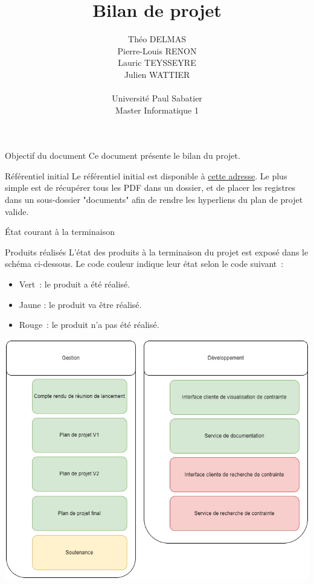 \documentclass[]{article}
\title{Bilan de projet}
\author{
    Théo DELMAS\\
    Pierre-Louis RENON\\
    Lauric TEYSSEYRE\\
    Julien WATTIER\\
    \\
    Université Paul Sabatier\\
    Master Informatique 1\\
   }
\begin{document}
\maketitle
\newpage
\tableofcontents
\newpage

\begin{section}{Objectif du document}
 Ce document présente le bilan du projet.
\end{section}

{
\setlength{\parindent}{0pt} %
\begin{section}{Référentiel initial}
 Le référentiel initial est disponible à \href{https://github.com/Szyckaa/UE-PROJET-DOCS-GESTION/releases/tag/2.0.0}{cette adresse}.
 Le plus simple est de récupérer tous les PDF dans un dossier, et de placer les registres dans un sous-dossier "documents" afin de rendre les hyperliens du plan de projet valide.
\end{section}

\begin{section}{État courant à la terminaison}
 \begin{subsection}{Produits réalisés}
     L’état des produits à la terminaison du projet est exposé dans le schéma ci-dessous. Le code couleur indique leur état selon le code suivant :

     \begin{itemize}
         \item Vert : le produit a été réalisé.
         \item Jaune : le produit va être réalisé.
         \item Rouge : le produit n’a pas été réalisé.
     \end{itemize}

     \includegraphics[scale=0.49]{IMG/PBS_final}


\end{subsection}
\end{section}}
\end{document}
